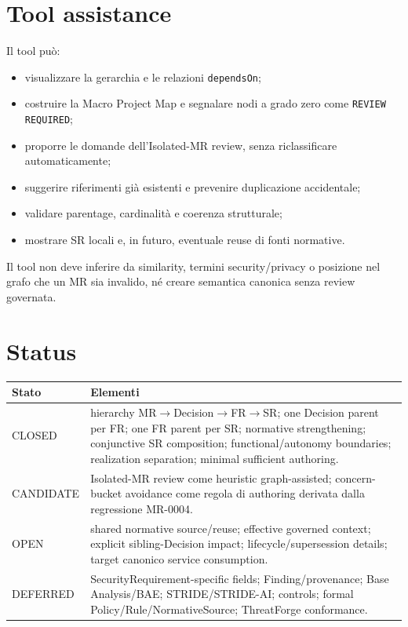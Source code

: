 \documentclass[11pt,a4paper]{article}
\begin{document}
\section{Tool assistance}
Il tool può:
\begin{itemize}
\item visualizzare la gerarchia e le relazioni \texttt{dependsOn};
\item costruire la Macro Project Map e segnalare nodi a grado zero come \texttt{REVIEW REQUIRED};
\item proporre le domande dell'Isolated-MR review, senza riclassificare automaticamente;
\item suggerire riferimenti già esistenti e prevenire duplicazione accidentale;
\item validare parentage, cardinalità e coerenza strutturale;
\item mostrare SR locali e, in futuro, eventuale reuse di fonti normative.
\end{itemize}
Il tool non deve inferire da similarity, termini security/privacy o posizione nel grafo che un MR sia invalido, né creare semantica canonica senza review governata.

\section{Status}
\begin{longtable}{p{}p{}}
\toprule
Stato & Elementi \\\midrule\endhead
CLOSED & hierarchy MR$\rightarrow$Decision$\rightarrow$FR$\rightarrow$SR; one Decision parent per FR; one FR parent per SR; normative strengthening; conjunctive SR composition; functional/autonomy boundaries; realization separation; minimal sufficient authoring. \\
CANDIDATE & Isolated-MR review come heuristic graph-assisted; concern-bucket avoidance come regola di authoring derivata dalla regressione MR-0004. \\
OPEN & shared normative source/reuse; effective governed context; explicit sibling-Decision impact; lifecycle/supersession details; target canonico service consumption. \\
DEFERRED & SecurityRequirement-specific fields; Finding/provenance; Base Analysis/BAE; STRIDE/STRIDE-AI; controls; formal Policy/Rule/NormativeSource; ThreatForge conformance. \\
\bottomrule
\end{longtable}
\end{document}
